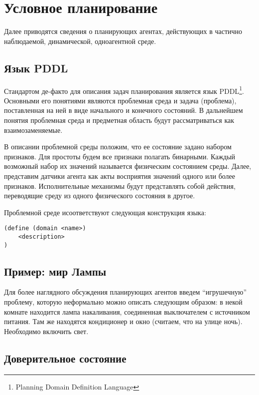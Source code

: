 \section{Условное планирование}

Далее приводятся сведения о планирующих агентах, действующих в частично
наблюдаемой, динамической, одноагентной среде.

\subsection{Язык PDDL}

Стандартом де-факто для описания задач планирования является язык
PDDL\footnote{Planning Domain Definition Language}. Основными его понятиями являются проблемная среда и
задача (проблема), поставленная на ней в виде начального и конечного
состояний. В дальнейшем понятия проблемная среда и предметная область будут рассматриваться как взаимозаменяемые.

В описании проблемной среды положим, что ее состояние задано набором
признаков. Для простоты будем все признаки полагать бинарными. Каждый
возможный набор их значений называется физическим состоянием среды.
Далее, представим датчики агента как акты восприятия значений одного или
более признаков. Исполнительные механизмы будут представлять собой
действия, переводящие среду из одного физического состояния в другое.

Проблемной среде исоответствуют следующая конструкция языка:

\begin{verbatim}
(define (domain <name>)
    <description>
)
\end{verbatim}

\subsection{Пример: мир Лампы}

Для более наглядного обсуждения планирующих агентов введем ``игрушечную'' проблему, которую неформально можно описать следующим образом: в некой
комнате находится лампа накаливания, соединенная выключателем с
источником питания. Там же находятся кондиционер и окно (считаем, что на
улице ночь). Необходимо включить свет.

\subsection{Доверительное состояние}

